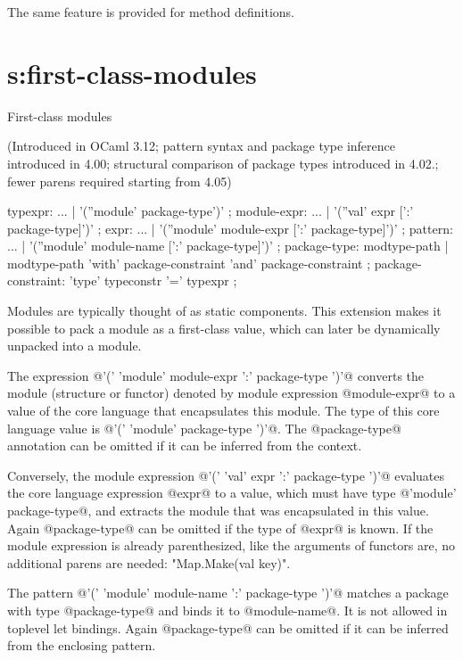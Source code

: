 The same feature is provided for method definitions.

\section{s:first-class-modules}{First-class modules}


(Introduced in OCaml 3.12; pattern syntax and package type inference
introduced in 4.00; structural comparison of package types introduced in 4.02.;
fewer parens required starting from 4.05)

\begin{syntax}
typexpr:
      ...
    | '(''module' package-type')'
;
module-expr:
      ...
    | '(''val' expr [':' package-type]')'
;
expr:
      ...
    | '(''module' module-expr [':' package-type]')'
;
pattern:
      ...
    | '(''module' module-name [':' package-type]')'
;
package-type:
      modtype-path
    | modtype-path 'with' package-constraint { 'and' package-constraint }
;
package-constraint:
          'type' typeconstr '=' typexpr
;
\end{syntax}

Modules are typically thought of as static components. This extension
makes it possible to pack a module as a first-class value, which can
later be dynamically unpacked into a module.

The expression @'(' 'module' module-expr ':' package-type ')'@ converts the
module (structure or functor) denoted by module expression @module-expr@
to a value of the core language that encapsulates this module.  The
type of this core language value is @'(' 'module' package-type ')'@.
The @package-type@ annotation can be omitted if it can be inferred
from the context.

Conversely, the module expression @'(' 'val' expr ':' package-type ')'@
evaluates the core language expression @expr@ to a value, which must
have type @'module' package-type@, and extracts the module that was
encapsulated in this value. Again @package-type@ can be omitted if the
type of @expr@ is known.
If the module expression is already parenthesized, like the arguments
of functors are, no additional parens are needed: "Map.Make(val key)".

The pattern @'(' 'module' module-name ':' package-type ')'@ matches a
package with type @package-type@ and binds it to @module-name@.
It is not allowed in toplevel let bindings.
Again @package-type@ can be omitted if it can be inferred from the
enclosing pattern.

